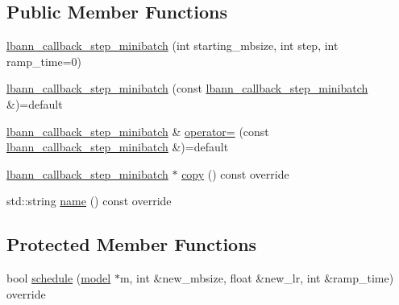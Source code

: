 \subsection*{Public Member Functions}
\begin{DoxyCompactItemize}
\item 
\hyperlink{classlbann_1_1lbann__callback__step__minibatch_a2ce11bed6c3a4d526c2fdd885970f49d}{lbann\+\_\+callback\+\_\+step\+\_\+minibatch} (int starting\+\_\+mbsize, int step, int ramp\+\_\+time=0)
\item 
\hyperlink{classlbann_1_1lbann__callback__step__minibatch_a66b34b96845274563dd72172dafd9079}{lbann\+\_\+callback\+\_\+step\+\_\+minibatch} (const \hyperlink{classlbann_1_1lbann__callback__step__minibatch}{lbann\+\_\+callback\+\_\+step\+\_\+minibatch} \&)=default
\item 
\hyperlink{classlbann_1_1lbann__callback__step__minibatch}{lbann\+\_\+callback\+\_\+step\+\_\+minibatch} \& \hyperlink{classlbann_1_1lbann__callback__step__minibatch_adea0e27a38a8094db757a57e4f976769}{operator=} (const \hyperlink{classlbann_1_1lbann__callback__step__minibatch}{lbann\+\_\+callback\+\_\+step\+\_\+minibatch} \&)=default
\item 
\hyperlink{classlbann_1_1lbann__callback__step__minibatch}{lbann\+\_\+callback\+\_\+step\+\_\+minibatch} $\ast$ \hyperlink{classlbann_1_1lbann__callback__step__minibatch_a3c291a8908f893d0ca372ae7c650bbb2}{copy} () const override
\item 
std\+::string \hyperlink{classlbann_1_1lbann__callback__step__minibatch_a2e07fa5a590d68b1b71059d9275ee12a}{name} () const override
\end{DoxyCompactItemize}
\subsection*{Protected Member Functions}
\begin{DoxyCompactItemize}
\item 
bool \hyperlink{classlbann_1_1lbann__callback__step__minibatch_a9ed85aa78f6e4fe4cf3427f9257a4610}{schedule} (\hyperlink{classlbann_1_1model}{model} $\ast$m, int \&new\+\_\+mbsize, float \&new\+\_\+lr, int \&ramp\+\_\+time) override
\end{DoxyCompactItemize}
